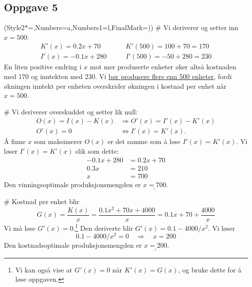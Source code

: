\documentclass[12pt, a4paper]
{article}						%
\def\answer#1{\underline{\underline{#1}}}
\begin{document}
\subsection*{Oppgave 5}
\begin{easylist}[enumerate]
	\ListProperties(Style2*=,Numbers=a,Numbers1=l,FinalMark={)})
	# Vi deriverer og setter inn $x = 500$:
	\begin{align*}
		K'(x) = 0.2x +70 \qquad & K'(500) = 100 + 70 = 170 \\
		I'(x) = -0.1x +280 \qquad & I'(500) = -50 + 280 = 230 
	\end{align*}
	En liten positive endring i $x$ mot mer produserte enheter øker altså
	kostnaden med 170 og inntekten med 230. Vi \answer{bør produsere flere enn
	500 enheter}, fordi økningen inntekt per enheten overskrider økningen i kostnad per enhet når $x = 500$.

	# Vi deriverer overskuddet og setter lik null:
	\begin{align*}
		O(x) = I(x) - K(x) &\Rightarrow O'(x) = I'(x) - K'(x) \\
		O'(x) = 0 &\Leftrightarrow I'(x) = K'(x).
	\end{align*}
	Å finne $x$ som maksimerer $O(x)$ er det samme som å løse $I'(x) = K'(x)$.
	Vi løser $I'(x) = K'(x)$ slik som dette:
	\begin{align*}
		-0.1x +280  &=  0.2x +70 \\
		0.3 x &= 210 \\
		x &= 700
	\end{align*}
	Den vinningsoptimale produksjonsmengden er $\answer{x = 700}$.
	
	# Kostnad per enhet blir
	\begin{equation*}
		G(x) = \frac{K(x)}{x} = \frac{0.1x^2 + 70x +4000}{x} =  0.1x + 70 + \frac{4000}{x}
	\end{equation*}
	Vi må løse $G'(x) = 0$.\footnote{Vi kan også vise at $G'(x) = 0$ når $K'(x) = G(x)$, og bruke dette for å løse oppgaven.} Den deriverte blir $G'(x) = 0.1 -4000/x^2$.
	Vi løser
	\begin{equation*}
		0.1 -4000/x^2 = 0 \quad \Rightarrow \quad x = 200
	\end{equation*}
	Den kostnadsoptimale produksjonsmengden er $\answer{x = 200}$.
\end{easylist}
\end{document}
